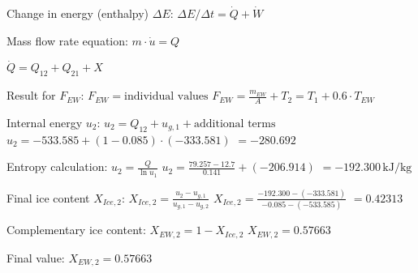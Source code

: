Change in energy (enthalpy) \( \Delta E \):  
\( \Delta E / \Delta t = \dot{Q} + \dot{W} \)  

Mass flow rate equation:  
\( m \cdot \dot{u} = Q \)  

\( \dot{Q} = Q_{12} + Q_{21} + X \)  

Result for \( F_{EW} \):  
\( F_{EW} = \text{individual values} \)  
\( F_{EW} = \frac{m_{EW}}{A} + T_2 = T_1 + 0.6 \cdot T_{EW} \)  

Internal energy \( u_2 \):  
\( u_2 = Q_{12} + u_{g,1} + \text{additional terms} \)  
\( u_2 = -533.585 + (1 - 0.085) \cdot (-333.581) \)  
\( = -280.692 \)  

Entropy calculation:  
\( u_2 = \frac{Q}{\ln u_1} \)  
\( u_2 = \frac{79.257 - 12.7}{0.141} + (-206.914) \)  
\( = -192.300 \, \text{kJ/kg} \)  

Final ice content \( X_{Ice,2} \):  
\( X_{Ice,2} = \frac{u_2 - u_{g,1}}{u_{g,1} - u_{g,2}} \)  
\( X_{Ice,2} = \frac{-192.300 - (-333.581)}{-0.085 - (-533.585)} \)  
\( = 0.42313 \)  

Complementary ice content:  
\( X_{EW,2} = 1 - X_{Ice,2} \)  
\( X_{EW,2} = 0.57663 \)  

Final value:  
\( X_{EW,2} = 0.57663 \)